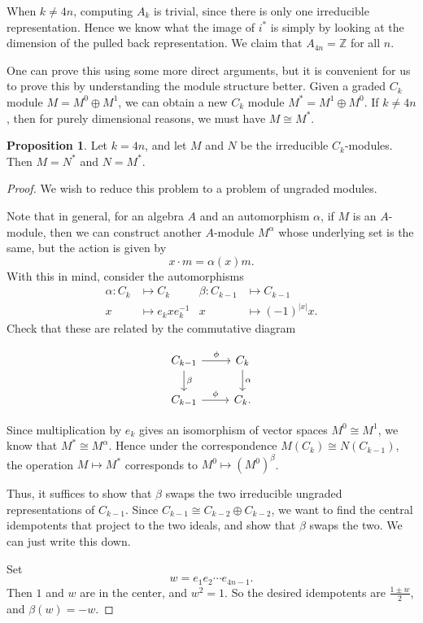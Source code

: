 \documentclass{shortart}
\theoremstyle{definition}
\newtheorem*{prop}{Proposition}
\newcommand\Z{\mathbb{Z}}
\begin{document}
When $k \not= 4n$, computing $A_k$ is trivial, since there is only one irreducible representation. Hence we know what the image of $i^*$ is simply by looking at the dimension of the pulled back representation. We claim that $A_{4n} = \Z$ for all $n$.

One can prove this using some more direct arguments, but it is convenient for us to prove this by understanding the module structure better. Given a graded $C_k$ module $M = M^0 \oplus M^1$, we can obtain a new $C_k$ module $M^* = M^1 \oplus M^0$. If $k \not= 4n$, then for purely dimensional reasons, we must have $M \cong M^*$.
\begin{prop}
  Let $k = 4n$, and let $M$ and $N$ be the irreducible $C_k$-modules. Then $M = N^*$ and $N = M^*$.
\end{prop}

\begin{proof}
  We wish to reduce this problem to a problem of ungraded modules.

  Note that in general, for an algebra $A$ and an automorphism $\alpha$, if $M$ is an $A$-module, then we can construct another $A$-module $M^\alpha$ whose underlying set is the same, but the action is given by
  \[
    x \cdot m = \alpha(x)m.
  \]
  With this in mind, consider the automorphisms
  \begin{align*}
    \alpha: C_k &\mapsto C_k & \beta: C_{k - 1} &\mapsto C_{k - 1}\\
    x &\mapsto e_k x e_k^{-1} & x &\mapsto (-1)^{|x|} x.
  \end{align*}
  Check that these are related by the commutative diagram
  \begin{useimager}
    \[
      \begin{tikzcd}
        C_{k - 1} \ar[r, "\phi"] \ar[d, "\beta"] & C_k \ar[d, "\alpha"]\\
        C_{k - 1} \ar[r, "\phi"] & C_k.
      \end{tikzcd}
    \]
  \end{useimager}
  Since multiplication by $e_k$ gives an isomorphism of vector spaces $M^0 \cong M^1$, we know that $M^* \cong M^{\alpha}$. Hence under the correspondence $M(C_k) \cong N(C_{k - 1})$, the operation $M \mapsto M^*$ corresponds to $M^0 \mapsto (M^0)^{\beta}$.

  Thus, it suffices to show that $\beta$ swaps the two irreducible ungraded representations of $C_{k - 1}$. Since $C_{k - 1} \cong C_{k - 2} \oplus C_{k - 2}$, we want to find the central idempotents that project to the two ideals, and show that $\beta$ swaps the two. We can just write this down.

  Set
  \[
    w = e_1 e_2 \cdots e_{4n - 1}.
  \]
  Then $1$ and $w$ are in the center, and $w^2 = 1$. So the desired idempotents are $\frac{1 \pm w}{2}$, and $\beta(w) = -w$.
\end{proof}
\end{document}
